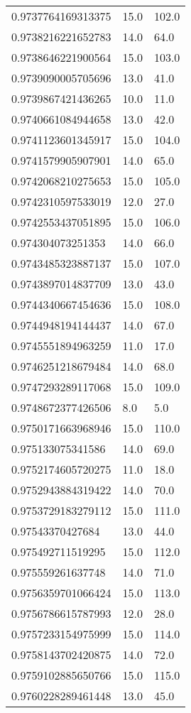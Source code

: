 \begin{center}
\begin{supertabular}[H]{p{0.30\textwidth}p{0.05\textwidth}p{0.05\textwidth}}
0.9737764169313375 & 15.0 & 102.0 \\ 
0.9738216221652783 & 14.0 & 64.0 \\ 
0.9738646221900564 & 15.0 & 103.0 \\ 
0.9739090005705696 & 13.0 & 41.0 \\ 
0.9739867421436265 & 10.0 & 11.0 \\ 
0.9740661084944658 & 13.0 & 42.0 \\ 
0.9741123601345917 & 15.0 & 104.0 \\ 
0.9741579905907901 & 14.0 & 65.0 \\ 
0.9742068210275653 & 15.0 & 105.0 \\ 
0.9742310597533019 & 12.0 & 27.0 \\ 
0.9742553437051895 & 15.0 & 106.0 \\ 
0.974304073251353 & 14.0 & 66.0 \\ 
0.9743485323887137 & 15.0 & 107.0 \\ 
0.9743897014837709 & 13.0 & 43.0 \\ 
0.9744340667454636 & 15.0 & 108.0 \\ 
0.9744948194144437 & 14.0 & 67.0 \\ 
0.9745551894963259 & 11.0 & 17.0 \\ 
0.9746251218679484 & 14.0 & 68.0 \\ 
0.9747293289117068 & 15.0 & 109.0 \\ 
0.9748672377426506 & 8.0 & 5.0 \\ 
0.9750171663968946 & 15.0 & 110.0 \\ 
0.975133075341586 & 14.0 & 69.0 \\ 
0.9752174605720275 & 11.0 & 18.0 \\ 
0.9752943884319422 & 14.0 & 70.0 \\ 
0.9753729183279112 & 15.0 & 111.0 \\ 
0.97543370427684 & 13.0 & 44.0 \\ 
0.975492711519295 & 15.0 & 112.0 \\ 
0.975559261637748 & 14.0 & 71.0 \\ 
0.9756359701066424 & 15.0 & 113.0 \\ 
0.9756786615787993 & 12.0 & 28.0 \\ 
0.9757233154975999 & 15.0 & 114.0 \\ 
0.9758143702420875 & 14.0 & 72.0 \\ 
0.9759102885650766 & 15.0 & 115.0 \\ 
0.9760228289461448 & 13.0 & 45.0 \\ 

\end{supertabular}
\end{center}
